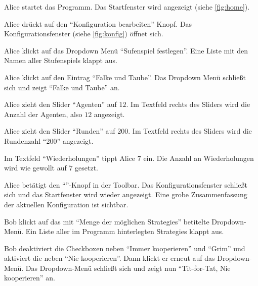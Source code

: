 \documentclass[parskip=full,11pt]{scrartcl}
\begin{document}

{Alice startet das Programm.}
{Das Startfenster wird angezeigt (siehe \cref{fig:home}).}

{Alice drückt auf den \enquote{\Gls{Konfiguration} bearbeiten} Knopf.}
{Das Konfigurationsfenster (siehe \cref{fig:konfig}) öffnet sich.}

{Alice klickt auf das Dropdown Menü \enquote{Sufenspiel festlegen}.}
{Eine Liste mit den Namen aller \Glspl{Stufenspiel} klappt aus.}

{Alice klickt auf den Eintrag \enquote{Falke und Taube}.}
{Das Dropdown Menü schließt sich und zeigt \enquote{Falke und Taube} an.}

{Alice zieht den Slider \enquote{Agenten} auf \(12\).}
{Im Textfeld rechts des Sliders wird die Anzahl der Agenten, also \(12\) angezeigt.}

{Alice zieht den Slider \enquote{Runden} auf \(200\).}%
{Im Textfeld rechts des Sliders wird die Rundenzahl \enquote{200} angezeigt.}

{Im Textfeld \enquote{Wiederholungen} tippt Alice \(7\) ein.}
{Die Anzahl an Wiederholungen wird wie gewollt auf \(7\) gesetzt.}

{Alice betätigt den \enquote{\checkmark}-Knopf in der Toolbar.}
{Das Konfigurationsfenster schließt sich und das Startfenster wird wieder angezeigt. Eine grobe Zusammenfassung der aktuellen \Gls{Konfiguration} ist sichtbar.}

{Bob klickt auf das mit \enquote{Menge der möglichen \Glspl{Strategie}} betitelte Dropdown-Menü.}
{Ein Liste aller im Programm hinterlegten \Glspl{Strategie} klappt aus.}

{Bob deaktiviert die Checkboxen neben \enquote{Immer kooperieren} und \enquote{Grim} und aktiviert die neben \enquote{Nie kooperieren}. Dann klickt er erneut auf das Dropdown-Menü.}
{Das Dropdown-Menü schließt sich und zeigt nun \enquote{Tit-for-Tat, Nie kooperieren} an.}
\end{document}
